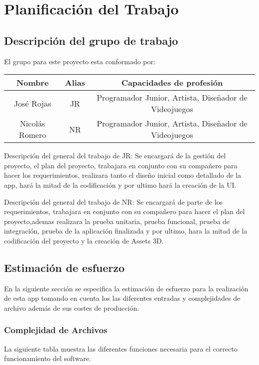 \section{Planificación del Trabajo}

\subsection{Descripción del grupo de trabajo}
El grupo para este proyecto esta conformado por:

\begin{longtable}{|c|c|c|}
\hline 
Nombre & Alias & Capacidades de profesión \\ 
\hline 
José Rojas & JR & Programador Junior, Artista, Diseñador de Videojuegos \\ 
\hline 
Nicolás Romero & NR & Programador Junior, Artista, Diseñador de Videojuegos \\ 
\hline 
\end{longtable} 

Descripción del general del trabajo de JR: Se encargará de la gestión del proyecto, el
plan del proyecto, trabajara en conjunto con su compañero para hacer los requerimientos,
realizara tanto el diseño inicial como detallado de la app, hará la mitad de la codificación y por ultimo hará la creación de la UI.

Descripción del general del trabajo de NR: Se encargará de parte de los requerimientos,
trabajara en conjunto con su compañero para hacer el plan del proyecto,ademas realizara la
prueba unitaria, prueba funcional, prueba de integración, prueba de la aplicación finalizada
y por ultimo, hara la mitad de la codificación del proyecto y la creación de Assets 3D.


\subsection{Estimación de esfuerzo}
En la siguiente sección se especifica la estimación de esfuerzo para la realización de esta app tomando en cuenta los las diferentes entradas y complejidades de archivo además de sus costes de producción.

\subsubsection{Complejidad de Archivos}
La siguiente tabla muestra las diferentes funciones necesaria para el correcto funcionamiento del software.

